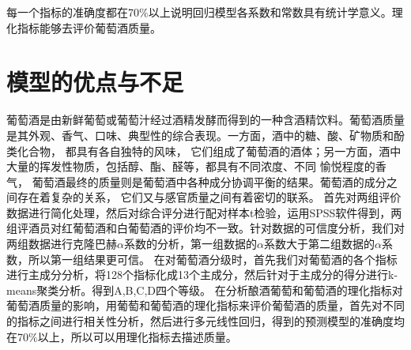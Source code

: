 \documentclass[UTF8,12.05pt]{ctexart}
\begin{document}
每一个指标的准确度都在70$\%$以上说明回归模型各系数和常数具有统计学意义。理化指标能够去评价葡萄酒质量。
\section{\heiti{}模型的优点与不足}
葡萄酒是由新鲜葡萄或葡萄汁经过酒精发酵而得到的一种含酒精饮料。葡萄酒质量是其外观、香气、口味、典型性的综合表现。一方面，酒中的糖、酸、矿物质和酚类化合物， 都具有各自独特的风味， 它们组成了葡萄酒的酒体；另一方面，酒中大量的挥发性物质，包括醇、酯、醛等，都具有不同浓度、不同
愉悦程度的香气， 葡萄酒最终的质量则是葡萄酒中各种成分协调平衡的结果。葡萄酒的成分之间存在着复杂的关系， 它们又与感官质量之间有着密切的联系。
首先对两组评价数据进行简化处理，然后对综合评分进行配对样本t检验，运用SPSS软件得到，两组评酒员对红葡萄酒和白葡萄酒的评价均不一致。针对数据的可信度分析，我们对两组数据进行克隆巴赫$\alpha$系数的分析，第一组数据的$\alpha$系数大于第二组数据的$\alpha$系数，所以第一组结果更可信。
在对葡萄酒分级时，首先我们对葡萄酒的各个指标进行主成分分析，将128个指标化成13个主成分，然后针对于主成分的得分进行k-means聚类分析。得到A,B,C,D四个等级。
在分析酿酒葡萄和葡萄酒的理化指标对葡萄酒质量的影响，用葡萄和葡萄酒的理化指标来评价葡萄酒的质量，首先对不同的指标之间进行相关性分析，然后进行多元线性回归，得到的预测模型的准确度均在70$\%$以上，所以可以用理化指标去描述质量。



\end{document}
